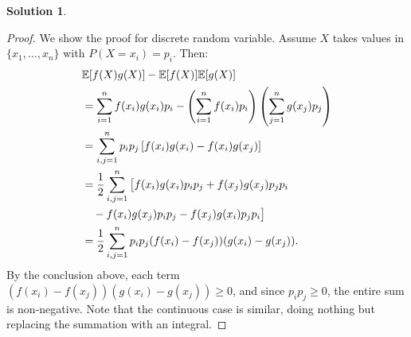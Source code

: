 \documentclass[12pt]{article}
\theoremstyle{definition}
\newtheorem*{solution}{\normalfont\textbf{Solution}}
\begin{document}
\begin{enumerate}[leftmargin=*]
\begin{solution}
\begin{proof}
                We show the proof for discrete random variable. Assume \( X \) takes values in \( \{x_1, \dots, x_n\} \) with \( P(X = x_i) = p_i \). Then:
                \begin{align*}
                &\mathbb{E}[f(X)g(X)] - \mathbb{E}[f(X)]\mathbb{E}[g(X)] \\
                &= \sum_{i=1}^n f(x_i)g(x_i)p_i - \left( \sum_{i=1}^n f(x_i)p_i \right)\left( \sum_{j=1}^n g(x_j)p_j \right) \\
                &= \sum_{i,j=1}^n p_i p_j \left[ f(x_i)g(x_i) - f(x_i)g(x_j) \right] \\
                &= \frac{1}{2} \sum_{i,j=1}^n \big[ 
                    f(x_i)g(x_i)p_ip_j 
                + f(x_j)g(x_j)p_jp_i \notag \\
                &\quad 
                - f(x_i)g(x_j)p_ip_j 
                - f(x_j)g(x_i)p_jp_i 
                \big]\\
                &= \frac{1}{2} \sum_{i,j=1}^n p_i p_j (f(x_i) - f(x_j))(g(x_i) - g(x_j)).
                \end{align*}
                By the conclusion above, each term \( (f(x_i) - f(x_j))(g(x_i) - g(x_j)) \geq 0 \), and since \( p_i p_j \geq 0 \), the entire sum is non-negative.
                Note that the continuous case is similar, doing nothing but replacing the summation with an integral.
            \end{proof}    
        \end{solution}
    

\end{enumerate}
\end{document}

